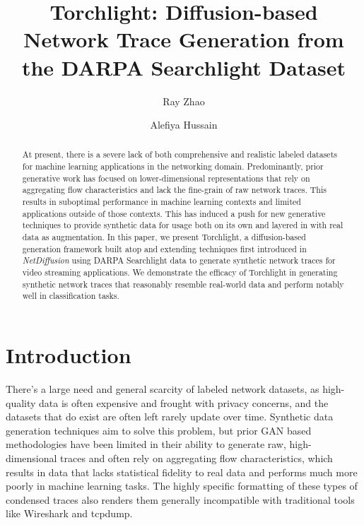 \documentclass[acmsmall, nonacm]{acmart}
\begin{document}
\title{Torchlight: Diffusion-based Network Trace Generation from the DARPA Searchlight Dataset}

\author{Ray Zhao}

\author{Alefiya Hussain}

\renewcommand{\shortauthors}{Zhao, Hussain}

\begin{abstract}
  At present, there is a severe lack of both comprehensive and realistic labeled datasets
  for machine learning applications in the networking domain. Predominantly, prior generative
  work has focused on lower-dimensional representations that rely on aggregating flow 
  characteristics and lack the fine-grain of raw network traces. This results in suboptimal
  performance in machine learning contexts and limited applications outside of those 
  contexts. This has induced a push for new generative techniques to provide 
  synthetic data for usage both on its own and layered in with real data as augmentation.
  In this paper, we present Torchlight, a diffusion-based
  generation framework built atop and extending techniques first introduced in 
  \textit{NetDiffusion} \cite{Jiang2024} using DARPA Searchlight \cite{Ardi2022} data to generate synthetic network traces
  for video streaming applications. We demonstrate the efficacy of Torchlight in generating
  synthetic network traces that reasonably resemble real-world data and perform notably well
  in classification tasks. 
\end{abstract}

\maketitle

\section{Introduction}
There's a large need and general scarcity of labeled network datasets,
as high-quality data is often expensive and frought with privacy concerns,
and the datasets that do exist are often left rarely update over time.
Synthetic data generation techniques aim to solve this problem, but prior
GAN based methodologies have been limited in their ability to generate
raw, high-dimensional traces and often rely on aggregating flow characteristics,
which results in data that lacks statistical fidelity to real data and performs
much more poorly in machine learning tasks. The highly specific formatting of
these types of condensed traces also renders them generally incompatible with
traditional tools like Wireshark and tcpdump.
\end{document}
